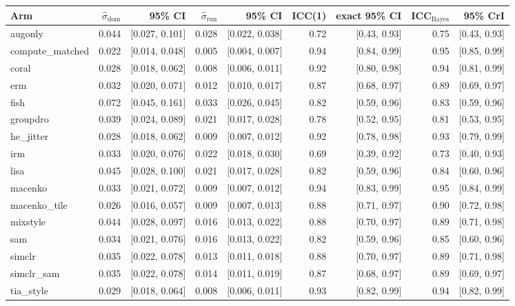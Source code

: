 \begin{tabular}{lrrrrrrrr}
\toprule
Arm & $\hat\sigma_\text{dom}$ & 95\% CI & $\hat\sigma_\text{run}$ & 95\% CI & ICC(1) & exact 95\% CI & ICC$_\text{Bayes}$ & 95\% CrI \\
\midrule
augonly & 0.044 & [0.027, 0.101] & 0.028 & [0.022, 0.038] & 0.72 & [0.43, 0.93] & 0.75 & [0.43, 0.93] \\
compute\_matched & 0.022 & [0.014, 0.048] & 0.005 & [0.004, 0.007] & 0.94 & [0.84, 0.99] & 0.95 & [0.85, 0.99] \\
coral & 0.028 & [0.018, 0.062] & 0.008 & [0.006, 0.011] & 0.92 & [0.80, 0.98] & 0.94 & [0.81, 0.99] \\
erm & 0.032 & [0.020, 0.071] & 0.012 & [0.010, 0.017] & 0.87 & [0.68, 0.97] & 0.89 & [0.69, 0.97] \\
fish & 0.072 & [0.045, 0.161] & 0.033 & [0.026, 0.045] & 0.82 & [0.59, 0.96] & 0.83 & [0.59, 0.96] \\
groupdro & 0.039 & [0.024, 0.089] & 0.021 & [0.017, 0.028] & 0.78 & [0.52, 0.95] & 0.81 & [0.53, 0.95] \\
he\_jitter & 0.028 & [0.018, 0.062] & 0.009 & [0.007, 0.012] & 0.92 & [0.78, 0.98] & 0.93 & [0.79, 0.99] \\
irm & 0.033 & [0.020, 0.076] & 0.022 & [0.018, 0.030] & 0.69 & [0.39, 0.92] & 0.73 & [0.40, 0.93] \\
lisa & 0.045 & [0.028, 0.100] & 0.021 & [0.017, 0.028] & 0.82 & [0.59, 0.96] & 0.84 & [0.60, 0.96] \\
macenko & 0.033 & [0.021, 0.072] & 0.009 & [0.007, 0.012] & 0.94 & [0.83, 0.99] & 0.95 & [0.84, 0.99] \\
macenko\_tile & 0.026 & [0.016, 0.057] & 0.009 & [0.007, 0.013] & 0.88 & [0.71, 0.97] & 0.90 & [0.72, 0.98] \\
mixstyle & 0.044 & [0.028, 0.097] & 0.016 & [0.013, 0.022] & 0.88 & [0.70, 0.97] & 0.89 & [0.71, 0.98] \\
sam & 0.034 & [0.021, 0.076] & 0.016 & [0.013, 0.022] & 0.82 & [0.59, 0.96] & 0.85 & [0.60, 0.96] \\
simclr & 0.035 & [0.022, 0.078] & 0.013 & [0.011, 0.018] & 0.88 & [0.70, 0.97] & 0.89 & [0.71, 0.98] \\
simclr\_sam & 0.035 & [0.022, 0.078] & 0.014 & [0.011, 0.019] & 0.87 & [0.68, 0.97] & 0.89 & [0.69, 0.97] \\
tia\_style & 0.029 & [0.018, 0.064] & 0.008 & [0.006, 0.011] & 0.93 & [0.82, 0.99] & 0.94 & [0.82, 0.99] \\
\bottomrule
\end{tabular}
